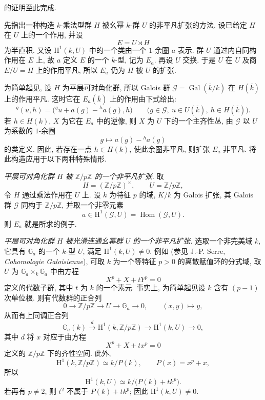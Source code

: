  的证明至此完成.


先指出一种构造 \(k\)-乘法型群 \(H\) 被幺幂 \(k\)-群 \(U\) 的非平凡扩张的方法.
设已给定 \(H\) 在 \(U\) 上的一个作用, 并设
\[
  E=U\rtimes H
\]
为半直积. 又设 \(\mathrm H^1(k,U)\) 中的一个类由一个 \(1\)-余圈 \(a\) 表示.
群 \(U\) 通过内自同构作用在 \(E\) 上,
故 \(a\) 定义 \(E\) 的一个 \(k\)-型, 记为 \(E_a\).
再设 \(U\) 交换. 于是 \(U\) 在 \(U\) 及商 \(E/U=H\) 上的作用平凡,
所以 \(E_a\) 仍为 \(H\) 被 \(U\) 的扩张.

为简单起见, 设 \(H\) 为平展可对角化群,
所以 Galois 群 \(\mathscr G=\operatorname{Gal}(\overline{k}/k)\)
在 \(H(\overline{k})\) 上的作用平凡.
这时它在 \(E_a(\overline{k})\) 上的作用由下式给出:
\[
  {}^g(u,h)
  =\bigl({}^g u+a(g)-{}^h a(g),h\bigr)
  \qquad
  \bigl(g\in\mathscr G,\ u\in U(\overline{k}),\
        h\in H(\overline{k})\bigr).
\]
若 \(h\in H(k)\), \(X\) 为它在 \(E_a\) 中的逆像,
则 \(X\) 为 \(U\) 下的一个主齐性丛,
由 \(\mathscr G\) 以 \(U\) 为系数的 \(1\)-余圈
\[
  g\longmapsto a(g)-{}^h a(g)
\]
的类定义. 因此, 若存在一点 \(h\in H(k)\), 使此余圈非平凡,
则扩张 \(E_a\) 非平凡. 将此构造应用于以下两种特殊情形.

\smallskip
\noindent
\emph{ 平展可对角化群 \(H\) 被 \(\mathbb Z/p\mathbb Z\) 的一个非平凡扩张.}
取
\[
  H=(\mathbb Z/p\mathbb Z)^\times,
  \qquad U=\mathbb Z/p\mathbb Z,
\]
令 \(H\) 通过乘法作用在 \(U\) 上.
设 \(k\) 为特征 \(p\) 的域, \(K/k\) 为 Galois 扩张,
其 Galois 群 \(\mathscr G\) 同构于 \(\mathbb Z/p\mathbb Z\), 并取一个非零元素
\[
  a\in\mathrm H^1(\mathscr G,U)
   =\operatorname{Hom}(\mathscr G,U).
\]
则 \(E_a\) 就是所求的例子.

\smallskip
\noindent
\emph{ 平展可对角化群 \(H\)
被光滑连通幺幂群 \(U\) 的一个非平凡扩张.}
选取一个非完美域 \(k\), 它具有 \(\mathbb G_a\) 的一个 \(k\)-型 \(U\),
满足 \(\mathrm H^1(k,U)\ne0\).
例如 (参见 J.-P. Serre, \emph{Cohomologie Galoisienne}),
可取 \(k\) 为一个等特征 \(p>0\) 的离散赋值环的分式域,
取 \(U\) 为 \(\mathbb G_a\times_k\mathbb G_a\) 中由方程
\[
  X^p+X+tY^p=0
\]
定义的代数子群, 其中 \(t\) 为 \(k\) 的一个素元.
事实上, 为简单起见设 \(k\) 含有 \((p-1)\) 次单位根.
则有代数群的正合列
\[
  0\longrightarrow\mathbb Z/p\mathbb Z
   \longrightarrow U
   \longrightarrow\mathbb G_a
   \longrightarrow0,
  \qquad
  (x,y)\longmapsto y,
\]
从而有上同调正合列
\[
  \mathbb G_a(k)\xrightarrow{\,d\,}
  \mathrm H^1(k,\mathbb Z/p\mathbb Z)
  \longrightarrow\mathrm H^1(k,U)
  \longrightarrow0,
\]
其中 \(d\) 将 \(x\) 对应于由方程
\[
  X^p+X+tx^p=0
\]
定义的 \(\mathbb Z/p\mathbb Z\) 下的齐性空间. 此外,
\[
  \mathrm H^1(k,\mathbb Z/p\mathbb Z)\simeq k/P(k),
  \qquad P(x)=x^p+x,
\]
所以
\[
  \mathrm H^1(k,U)\simeq k/\bigl(P(k)+tk^p\bigr).
\]
若再有 \(p\ne2\), 则 \(t^2\) 不属于 \(P(k)+tk^p\);
因此 \(\mathrm H^1(k,U)\ne0\).

